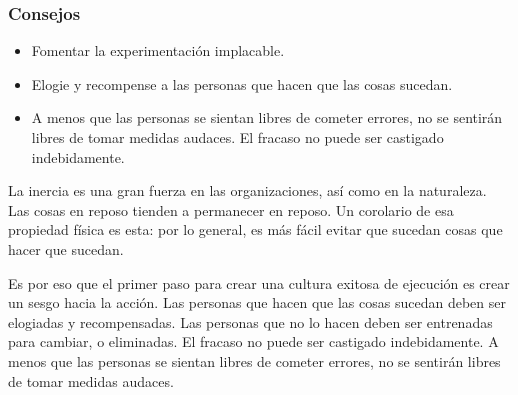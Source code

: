 \documentclass[10pt]{book}
\begin{document}
\subsubsection{Consejos}
\begin{itemize}
\item Fomentar la experimentación implacable.
\item Elogie y recompense a las personas que hacen que las cosas sucedan.
\item A menos que las personas se sientan libres de cometer errores, no se sentirán libres de tomar medidas audaces. El fracaso no puede ser castigado indebidamente.
\end{itemize}
La inercia es una gran fuerza en las organizaciones, así como en la naturaleza. Las cosas en reposo tienden a permanecer en reposo. Un corolario de esa propiedad física es esta: por lo general, es más fácil evitar que sucedan cosas que hacer que sucedan.

Es por eso que el primer paso para crear una cultura exitosa de ejecución es crear un sesgo hacia la acción. Las personas que hacen que las cosas sucedan deben ser elogiadas y recompensadas. Las personas que no lo hacen deben ser entrenadas para cambiar, o eliminadas. El fracaso no puede ser castigado indebidamente. A menos que las personas se sientan libres de cometer errores, no se sentirán libres de tomar medidas audaces.
\end{document}
